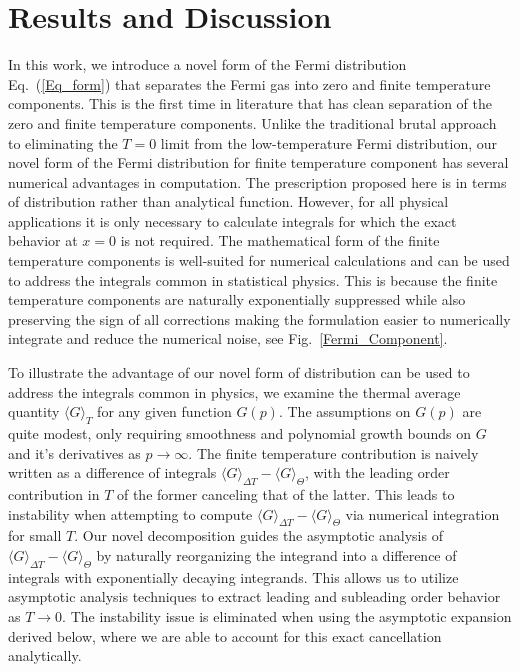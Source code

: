 \documentclass[sn-mathphys,Numbered]{sn-jnl}
\begin{document}
\section{Results and Discussion}
\label{sec12}
In this work, we introduce a novel form of the Fermi distribution Eq.~(\ref{Eq_form}) that separates the Fermi gas into zero and finite temperature components. This is the first time in literature that has clean separation of the zero and finite temperature components. Unlike the traditional brutal approach to eliminating the $T=0$ limit from the low-temperature Fermi distribution, our novel form of the Fermi distribution for finite temperature component has several numerical advantages in computation. The prescription proposed here is in terms of distribution rather than analytical function. However, for all physical applications it is only necessary to calculate integrals for which the exact behavior at $x=0$ is not required. 
The mathematical form of the finite temperature components is well-suited for numerical calculations and can be used to address the integrals common in statistical physics. This is because the finite temperature components are naturally exponentially suppressed while also preserving the sign of all corrections making the formulation easier to numerically integrate and reduce the numerical noise, see Fig.~\ref{Fermi_Component}. 


To illustrate the advantage of our novel form of distribution can be used to address the integrals common in physics, we examine the thermal average quantity $\langle G\rangle_T$ for any given function $G(p)$. The assumptions on $G(p)$ are quite modest, only requiring smoothness and polynomial growth bounds on $G$ and it's derivatives as $p\to \infty$. The finite temperature contribution is naively written as a difference of integrals $\langle G\rangle_{\Delta T}-\langle G\rangle_\Theta$, with the leading order contribution in $T$ of the former canceling that of the latter.  This leads to instability when attempting to compute $\langle G\rangle_{\Delta T}-\langle G\rangle_\Theta$ via numerical integration for small $T$.  
Our novel decomposition guides the asymptotic analysis of $\langle G\rangle_{\Delta T}-\langle G\rangle_\Theta$ by naturally reorganizing the integrand into a difference of integrals with exponentially decaying integrands. This allows us to utilize asymptotic analysis techniques to   extract  leading and subleading order behavior as $T\to 0$.  The instability issue is eliminated when using the asymptotic expansion derived below, where we are able to account for this exact cancellation analytically. 
\end{document}
